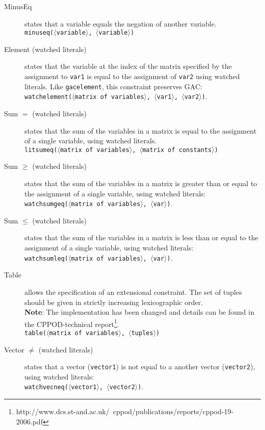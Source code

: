 \documentclass{article}
\begin{document}
\begin{small}
\begin{description}
\item[MinusEq] states that a variable equals the negation of another variable.
\\
\texttt{minuseq($\langle$variable$\rangle$, $\langle$variable$\rangle$)}

\item[Element (watched literals)] states that the variable at the index of the matrix
specified by the assignment to \texttt{var1} is equal to the
assignment of \texttt{var2} using watched literals.  Like \texttt{gacelement}, this constraint preserves GAC:\\ 
\texttt{watchelement($\langle$matrix of
variables$\rangle$, $\langle$var1$\rangle$, $\langle$var2$\rangle$)}.

\item[Sum $\mathbf{=}$ (watched literals)] states that the sum of the variables in a
matrix is equal to the assignment of a single variable, using watched literals. \\
\texttt{litsumeq($\langle$matrix of variables$\rangle$, $\langle$matrix of constants$\rangle$)}


\item[Sum $\mathbf{\geq}$ (watched literals)] states that the sum of the variables in a
matrix is greater than or equal to the assignment of a single
variable, using watched literals:\\ \texttt{watchsumgeq($\langle$matrix of variables$\rangle$,
$\langle$var$\rangle$)}.

\item[Sum $\mathbf{\leq}$ (watched literals)] states that the sum of the variables in a
matrix is less than or equal to the assignment of a single variable, using watched literals:\\
\texttt{watchsumleq($\langle$matrix of variables$\rangle$,
$\langle$var$\rangle$)}.

\item[Table] allows the specification of an extensional constraint. 
The set of tuples should be given in strictly increasing lexicographic order.\\
\textbf{Note}: The implementation has been changed and details can be found in the CPPOD-technical
report\footnote{http://www.dcs.st-and.ac.uk/~cppod/publications/reports/cppod-19-2006.pdf}.\\
\texttt{table($\langle$matrix of variables$\rangle$, $\langle$tuples$\rangle$)}

\item[Vector $ \mathbf{\neq}$ (watched literals)] states that a vector (\texttt{vector1}) is not
equal to a another vector (\texttt{vector2}), using watched literals:\\
\texttt{watchvecneq($\langle$vector1$\rangle$, $\langle$vector2$\rangle$)}.


\end{description}
\end{small}
\end{document}

